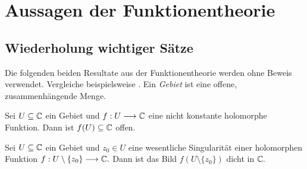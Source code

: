 \section{Aussagen der Funktionentheorie}

\subsection{Wiederholung wichtiger Sätze}
Die folgenden beiden Resultate aus der Funktionentheorie werden ohne Beweis verwendet. Vergleiche beispielsweise \cite{ahlfors}.
Ein \emph{Gebiet} ist eine offene, zusammenhängende Menge.
\begin{lemma} 
	Sei \(U\subseteq\mathbb{C}\) ein Gebiet und \(f:U\longrightarrow \mathbb{C}\) eine nicht konstante holomorphe Funktion. Dann ist \(f(U)\subseteq \mathbb{C}\) offen.
\end{lemma}
\begin{lemma} 
	Sei \(U\subseteq \mathbb{C}\) ein Gebiet und \(z_0\in U\) eine wesentliche Singularität einer holomorphen Funktion \(f:U\setminus\{z_0\}\longrightarrow \mathbb{C}.\) Dann ist das Bild \(f(U\setminus \{z_0\})\) dicht in \(\mathbb{C}.\)
\end{lemma}

